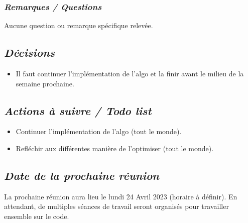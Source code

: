 \documentclass[french,a4paper]{article}
\begin{document}
\subsubsection*{\textit{Remarques / Questions}}
Aucune question ou remarque spécifique relevée.

\subsection*{\textit{Décisions}}
\begin{itemize}
  \item Il faut continuer l'implémentation de l'algo et la finir avant le milieu de la semaine prochaine.
\end{itemize}

\subsection*{\textit{Actions à suivre / Todo list}}
\begin{itemize}
  \item Continuer l'implémentation de l'algo (tout le monde).
  \item Refléchir aux différentes manière de l'optimiser (tout le monde).
\end{itemize}

\subsection*{\textit{Date de la prochaine réunion}}
La prochaine réunion aura lieu le lundi 24 Avril 2023 (horaire à définir). 
En attendant, de multiples séances de travail seront organisés pour travailler ensemble sur le code.
\end{document}
